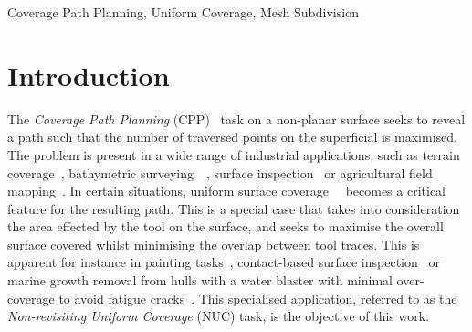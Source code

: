 \documentclass[lettersize,journal]{IEEEtran}
\begin{document}
\begin{IEEEkeywords}
Coverage Path Planning, Uniform Coverage, Mesh Subdivision
\end{IEEEkeywords}

\section{Introduction}
The \textit{Coverage Path Planning} (CPP)~\cite{Galceran2013A} task on a non-planar surface seeks to reveal a path such that the number of 
traversed points on the superficial is maximised. 
The problem is present in a wide range of industrial applications, such as terrain coverage~\cite{Eiben2020Problem}, bathymetric surveying~\cite{Galceran2013Planning}~\cite{Balampanis2017Spiral}, surface inspection~\cite{Ellefsen2017Multiobjective} or agricultural field mapping~\cite{Oksanen2009Coverage}.
In certain situations, uniform surface coverage~\cite{Tam1999Toward}~\cite{Atkar2005Uniform} becomes a critical feature for the resulting path.
This is a special case that takes into consideration the area effected by the tool on the surface, and seeks to maximise the overall surface covered whilst 
minimising the overlap between tool traces. This is apparent for instance in painting tasks~\cite{Chen2008Automated}, contact-based surface inspection~\cite{Liu2020Optimal} 
or marine growth removal from hulls with a water blaster with minimal over-coverage to avoid fatigue cracks~\cite{Hassan2018A}.
This specialised application, referred to as the \textit{Non-revisiting Uniform Coverage} (NUC) task, is the objective of this work. %
\end{document}
